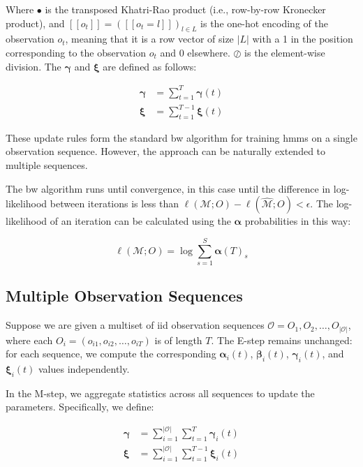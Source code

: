 Where $\smblkcircle$ is the transposed Khatri-Rao product (i.e., row-by-row Kronecker product), and $[[o_t]] = ([[o_t=l]])_{l \in L}$ is the one-hot encoding of the observation $o_t$, meaning that it is a row vector of size $|L|$ with a 1 in the position corresponding to the observation $o_t$ and 0 elsewhere.
$\oslash$ is the element-wise division.
The $\pmb{\gamma}$ and $\pmb{\xi}$ are defined as follows:


\begin{align}
    \pmb{\gamma} & = \sum_{t=1}^{T} \pmb{\gamma}(t) \\
    \pmb{\xi}    & = \sum_{t=1}^{T-1} \pmb{\xi}(t)
    \label{eq:gamma-xi-definitions}
\end{align}


These update rules form the standard \gls{bw} algorithm for training \glspl{hmm} on a single observation sequence.
However, the approach can be naturally extended to multiple sequences.

The \gls{bw} algorithm runs until convergence, in this case until the difference in log-likelihood between iterations is less than $\ell(\mathcal{M};O) - \ell(\hat{\mathcal{M}};O) < \epsilon$.
The log-likelihood of an iteration can be calculated using the $\pmb{\alpha}$ probabilities in this way:

\begin{equation}
    \ell(\mathcal{M};O) = \log \sum_{s=1}^{S} \pmb{\alpha}(T)_s
\end{equation}


\subsection{Multiple Observation Sequences}\label{subsec:multiple-observation-sequences}
Suppose we are given a multiset of \gls{iid} observation sequences $\mathcal{O} = {O_1, O_2, \ldots, O_{|\mathcal{O}|}}$, where each $O_i = (o_{i1}, o_{i2}, \ldots, o_{iT})$ is of length $T$.
The E-step remains unchanged: for each sequence, we compute the corresponding $\pmb{\alpha}_i(t)$, $\pmb{\beta}_i(t)$, $\pmb{\gamma}_i(t)$, and $\pmb{\xi}_i(t)$ values independently.

In the M-step, we aggregate statistics across all sequences to update the parameters.
Specifically, we define:

\begin{align}
    \pmb{\gamma} & = \sum_{i=1}^{|\mathcal{O}|}\sum_{t=1}^{T} \pmb{\gamma}_{i}(t) \\
    \pmb{\xi}    & = \sum_{i=1}^{|\mathcal{O}|}\sum_{t=1}^{T-1} \pmb{\xi}_{i}(t)
\end{align}

